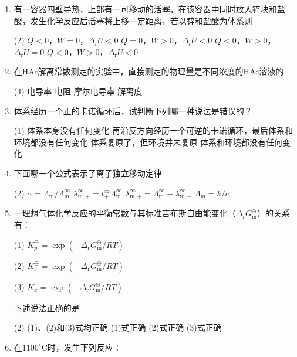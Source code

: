 \begin{enumerate}[label=\arabic*., itemsep=1.5ex]
    \item 有一容器四壁导热，上部有一可移动的活塞，在该容器中同时放入锌块和盐酸，发生化学反应后活塞将上移一定距离，若以锌和盐酸为体系则
    \begin{tasks}(2)
        \task $Q<0$，$W=0$，$\Delta_\mathrm{r}U<0$
        \task $Q=0$，$W>0$，$\Delta_\mathrm{r}U<0$
        \task $Q<0$，$W>0$，$\Delta_\mathrm{r}U=0$
        \task $Q<0$，$W>0$，$\Delta_\mathrm{r}U<0$
    \end{tasks}
    \item 在HAc解离常数测定的实验中，直接测定的物理量是不同浓度的HAc溶液的
    \begin{tasks}(4)
        \task 电导率
        \task 电阻
        \task 摩尔电导率
        \task 解离度
    \end{tasks}
    \item 体系经历一个正的卡诺循环后，试判断下列哪一种说法是错误的？
    \begin{tasks}(1)
        \task 体系本身没有任何变化
        \task 再沿反方向经历一个可逆的卡诺循环，最后体系和环境都没有任何变化
        \task 体系复原了，但环境并未复原
        \task 体系和环境都没有任何变化
    \end{tasks}
    \item 下面哪一个公式表示了离子独立移动定律
    \begin{tasks}(2)
        \task $\alpha = \Lambda_\mathrm{m}/\Lambda_\mathrm{m}^\infty$
        \task $\lambda_\mathrm{m,+}^\infty = t_+^\infty \Lambda_\mathrm{m}^\infty$
        \task $\lambda_\mathrm{m,+}^\infty = \Lambda_\mathrm{m}^\infty - \lambda_\mathrm{m,-}^\infty$
        \task $\Lambda_\mathrm{m} = k/c$
    \end{tasks}
    \item 一理想气体化学反应的平衡常数与其标准吉布斯自由能变化（$\Delta_\mathrm{r}G_\mathrm{m}^\ominus$）的关系有：
    
    (1) $K_p^\ominus = \exp(-\Delta_\mathrm{r}G_\mathrm{m}^\ominus/RT)$

    (2) $K_c^\ominus = \exp(-\Delta_\mathrm{r}G_\mathrm{m}^\ominus/RT)$

    (3) $K_x = \exp(-\Delta_\mathrm{r}G_\mathrm{m}^\ominus/RT)$
    
    下述说法正确的是
    \begin{tasks}(2)
        \task (1)、(2)和(3)式均正确
        \task (1)式正确
        \task (2)式正确
        \task (3)式正确
    \end{tasks}
    \item 在$1100^\circ\mathrm{C}$时，发生下列反应：
    

\end{enumerate}
